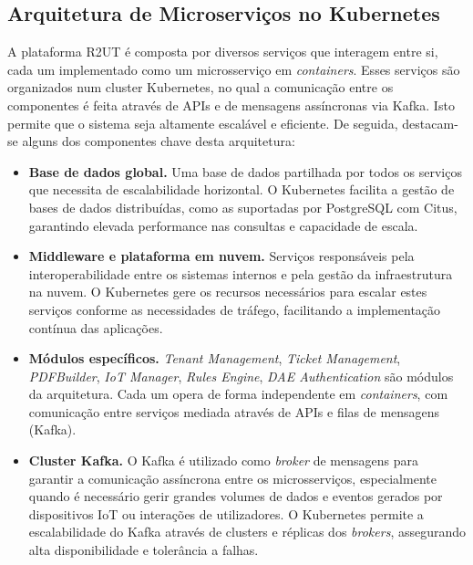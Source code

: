 \subsection{Arquitetura de Microserviços no Kubernetes}


A plataforma R2UT é composta por diversos serviços que interagem entre si, cada um implementado como um microsserviço em \textit{containers}. Esses serviços são organizados num cluster Kubernetes, no qual a comunicação entre os componentes é feita através de APIs e de mensagens assíncronas via Kafka. Isto permite que o sistema seja altamente escalável e eficiente. De seguida, destacam-se alguns dos componentes chave desta arquitetura:

\begin{itemize}
    \item \textbf{Base de dados global.} Uma base de dados partilhada por todos os serviços que necessita de escalabilidade horizontal. O Kubernetes facilita a gestão de bases de dados distribuídas, como as suportadas por PostgreSQL com Citus, garantindo elevada performance nas consultas e capacidade de escala.

    \item \textbf{Middleware e plataforma em nuvem.} Serviços responsáveis pela interoperabilidade entre os sistemas internos e pela gestão da infraestrutura na nuvem. O Kubernetes gere os recursos necessários para escalar estes serviços conforme as necessidades de tráfego, facilitando a implementação contínua das aplicações.

    \item \textbf{Módulos específicos.} \textit{Tenant Management}, \textit{Ticket Management}, \textit{PDFBuilder}, \textit{IoT Manager}, \textit{Rules Engine}, \textit{DAE Authentication} são módulos da arquitetura. Cada um opera de forma independente em \textit{containers}, com comunicação entre serviços mediada através de APIs e filas de mensagens (Kafka).

    \item \textbf{Cluster Kafka.} O Kafka é utilizado como \textit{broker} de mensagens para garantir a comunicação assíncrona entre os microsserviços, especialmente quando é necessário gerir grandes volumes de dados e eventos gerados por dispositivos IoT ou interações de utilizadores. O Kubernetes permite a escalabilidade do Kafka através de clusters e réplicas dos \textit{brokers}, assegurando alta disponibilidade e tolerância a falhas.
\end{itemize}


